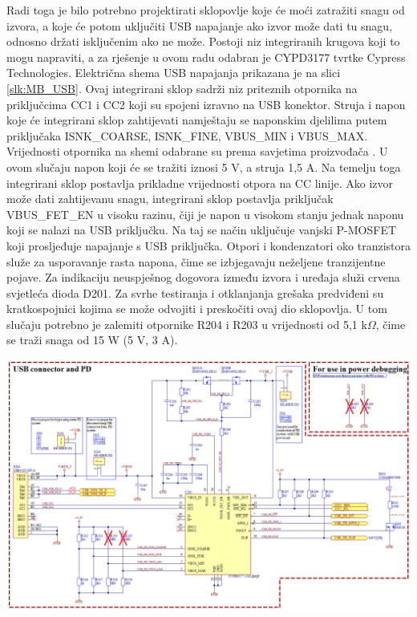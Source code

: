 Radi toga je bilo potrebno projektirati sklopovlje koje će moći zatražiti snagu od izvora, a koje će potom uključiti USB napajanje ako izvor može dati tu snagu, odnosno držati isključenim ako ne može. Postoji niz integriranih krugova koji to mogu napraviti, a za rješenje u ovom radu odabran je CYPD3177 tvrtke Cypress Technologies. Električna shema USB napajanja prikazana je na slici \ref{slk:MB_USB}. Ovaj integrirani sklop sadrži niz priteznih otpornika na priključcima CC1 i CC2 koji su spojeni izravno na USB konektor. Struja i napon koje će integrirani sklop zahtijevati namještaju se naponskim djelilima putem priključaka ISNK\_COARSE, ISNK\_FINE, VBUS\_MIN i VBUS\_MAX. Vrijednosti otpornika na shemi odabrane su prema savjetima proizvođača \cite{ct:usb}. U ovom slučaju napon koji će se tražiti iznosi 5 V, a struja 1,5 A. Na temelju toga integrirani sklop postavlja prikladne vrijednosti otpora na CC linije. Ako izvor može dati zahtijevanu snagu, integrirani sklop postavlja priključak VBUS\_FET\_EN u visoku razinu, čiji je napon u visokom stanju jednak naponu koji se nalazi na USB priključku. Na taj se način uključuje vanjski P-MOSFET koji prosljeđuje napajanje s USB priključka. Otpori i kondenzatori oko tranzistora služe za usporavanje rasta napona, čime se izbjegavaju neželjene tranzijentne pojave. Za indikaciju neuspješnog dogovora između izvora i uređaja služi crvena svjetleća dioda D201. Za svrhe testiranja i otklanjanja grešaka predviđeni su kratkospojnici kojima se može odvojiti i preskočiti ovaj dio sklopovlja. U tom slučaju potrebno je zalemiti otpornike R204 i R203 u vrijednosti od 5,1 k$\Omega$, čime se traži snaga od 15 W (5 V, 3 A).
\begin{center}
    \begin{sideways}
        \begin{minipage}{1.2\linewidth}
            \includegraphics[width=\linewidth]{Figures/MB_USB.png}
            \label{slk:MB_USB}
        \end{minipage}
    \end{sideways}
\end{center}

